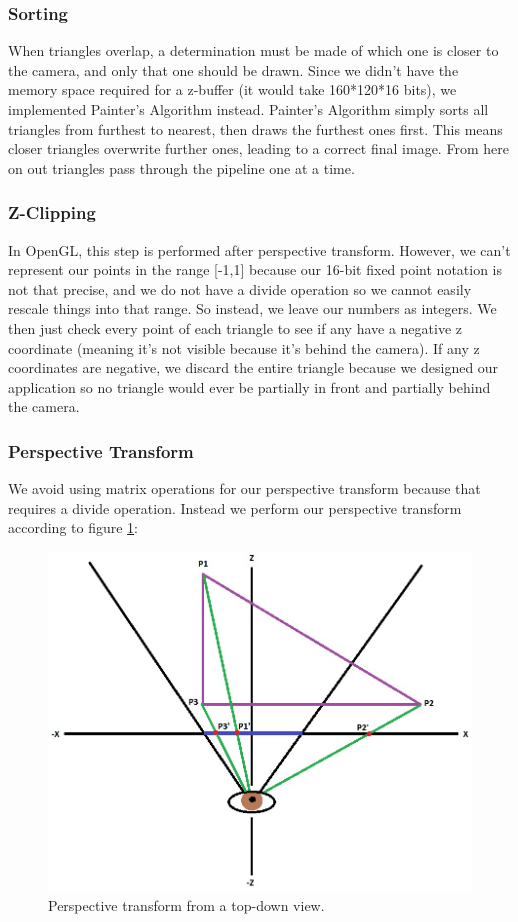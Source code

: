 \documentclass[onecolumn]{IEEEtran}
\begin{document}
\subsubsection{Sorting}
When triangles overlap, a determination must be made of which one is closer to the camera, and only that one should be drawn.  Since we didn't have the memory space required for a z-buffer (it would take 160*120*16 bits), we implemented Painter's Algorithm instead.  Painter's Algorithm simply sorts all triangles from furthest to nearest, then draws the furthest ones first.  This means closer triangles overwrite further ones, leading to a correct final image.  From here on out triangles pass through the pipeline one at a time.

\subsubsection{Z-Clipping}
In OpenGL, this step is performed after perspective transform.   However, we can't represent our points in the range [-1,1] because our 16-bit fixed point notation is not that precise, and we do not have a divide operation so we cannot easily rescale things into that range.  So instead, we leave our numbers as integers.  We then just check every point of each triangle to see if any have a negative z coordinate (meaning it's not visible because it's behind the camera).  If any z coordinates are negative, we discard the entire triangle because we designed our application so no triangle would ever be partially in front and partially behind the camera.

\subsubsection{Perspective Transform}
We avoid using matrix operations for our perspective transform because that requires a divide operation.  Instead we perform our perspective transform according to figure \ref{fig:perspectiveTransform}:

\begin{figure}[H]
	\centering
	\includegraphics[width=1.0\textwidth]{perspective.png}
	\caption{Perspective transform from a top-down view.}
	\label{fig:perspectiveTransform}
\end{figure}
\end{document}

